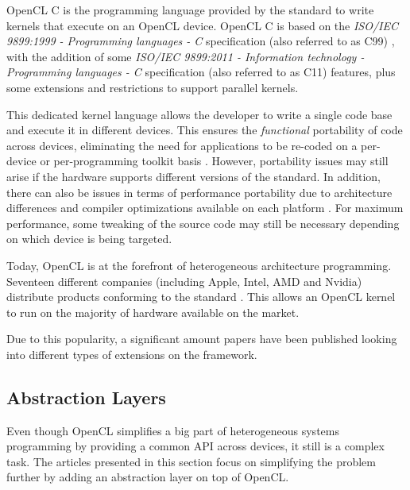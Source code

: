 OpenCL C \cite{opencl_c_spec} is the programming language provided by the standard to write kernels that execute on an OpenCL device. OpenCL C is based on the \textit{ISO/IEC 9899:1999 - Programming languages - C} specification (also referred to as C99) \cite{c99}, with the addition of some \textit{ISO/IEC 9899:2011 - Information technology - Programming languages - C} specification (also referred to as C11) \cite{c11} features, plus some extensions and restrictions to support parallel kernels.

This dedicated kernel language allows the developer to write a single code base and execute it in different devices. This ensures the \textit{functional} portability of code across devices, eliminating the need for applications to be re-coded on a per-device or per-programming toolkit basis \cite{performance_portability_2013}. However, portability issues may still arise if the hardware supports different versions of the standard. In addition, there can also be issues in terms of performance portability due to architecture differences and compiler optimizations available on each platform \cite{performance_portability_2019}. For maximum performance, some tweaking of the source code may still be necessary depending on which device is being targeted.


Today, OpenCL is at the forefront of heterogeneous architecture programming. Seventeen different companies (including Apple, Intel, AMD and Nvidia) distribute products conforming to the standard \cite{opencl_conformant_companies}. This allows an OpenCL kernel to run on the majority of hardware available on the market.

Due to this popularity, a significant amount papers have been published looking into different types of extensions on the framework.

\subsection{Abstraction Layers}
Even though OpenCL simplifies a big part of heterogeneous systems programming by providing a common API across devices, it still is a complex task. 
The articles presented in this section focus on simplifying the problem further by adding an abstraction layer on top of OpenCL.

